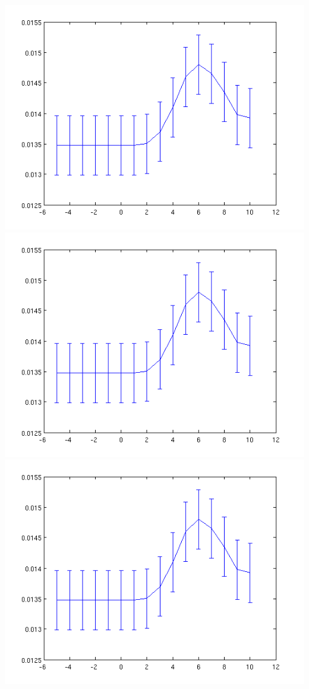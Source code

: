 \documentclass[a4paper]{article}
\begin{document}
\includegraphics[scale=0.2]{3}
\includegraphics[scale=0.2]{4}
\includegraphics[scale=0.2]{5}
\end{document}
